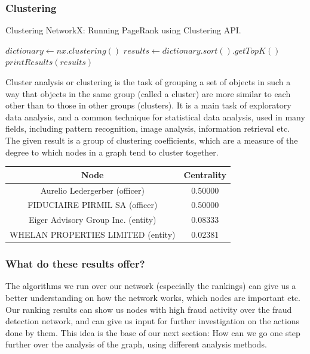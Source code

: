\documentclass[sigconf, nonacm]{acmart}
\begin{document}
\subsubsection{Clustering}

\begin{algorithm}
\caption{Clustering NetworkX: Running PageRank using Clustering API.}\label{alg:cap}
\begin{algorithmic}

\State $dictionary \gets nx.clustering()$
\State $results \gets dictionary.sort().getTopK()$
\State $printResults(results)$

\end{algorithmic}
\end{algorithm}
Cluster analysis or clustering is the task of grouping a set of objects in such a way that objects in the same group (called a cluster) are more similar to each other than to those in other groups (clusters). It is a main task of exploratory data analysis, and a common technique for statistical data analysis, used in many fields, including pattern recognition, image analysis, information retrieval etc. The given result is a group of clustering coefficients, which are a measure of the degree to which nodes in a graph tend to cluster together.\\
\begin{center} 
\begin{tabular}{||c | c||} 
 \hline
 Node & Centrality \\ [0.5ex] 
 \hline\hline
Aurelio Ledergerber (officer) & 0.50000 \\ 
 \hline
FIDUCIAIRE PIRMIL SA (officer) & 0.50000 \\
 \hline
Eiger Advisory Group Inc. (entity) & 0.08333 \\
 \hline
WHELAN PROPERTIES LIMITED (entity) & 0.02381 \\
 \hline
\end{tabular}
\end{center}

\subsubsection{What do these results offer?}
The algorithms we run over our network (especially the rankings) can give us a better understanding on how the network works, which nodes are important etc. Our ranking results can show us nodes with high fraud activity over the fraud detection network, and can give us input for further investigation on the actions done by them. This idea is the base of our next section: How can we go one step further over the analysis of the graph, using different analysis methods.
\end{document}
